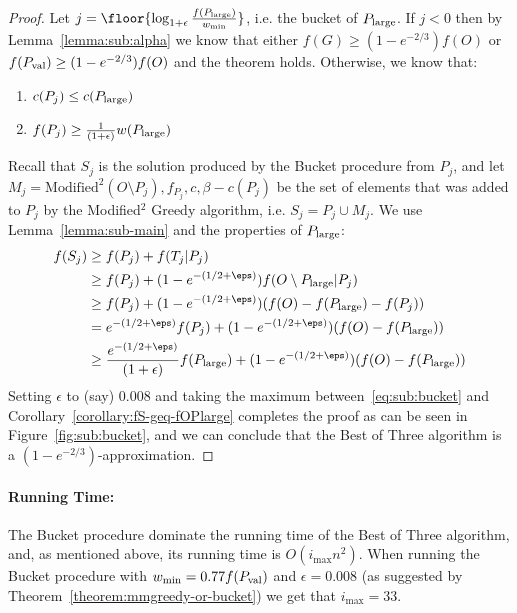 \begin{proof}
	Let $j = \floor{\log_{1 + \epsilon}\frac{f(\pLarge)}{w_{\min}}}$, i.e. the bucket of $P_{\text{large}}$.
	If $j < 0$ then by Lemma~\ref{lemma:sub:alpha} we know that either $f(G) \geq (1 - e^{-2/3})f(O)$ or $f(P_{\text{val}}) \geq (1 - e^{-2/3})f(O)$ and the theorem holds.
	Otherwise, we know that:
	\begin{enumerate}
		\item $c(P_j) \leq c(P_{\text{large}})$
		\item $f(P_j) \geq \frac{1}{(1 + \epsilon)}w(P_{\text{large}})$
	\end{enumerate}
	Recall that $S_{j}$ is the solution produced by the Bucket procedure from $P_j$, and let $M_j = \text{Modified}^2(O \setminus P_j), f_{P_j}, c, \beta - c(P_j)$ be the set of elements that was added to $P_j$ by the Modified$^2$ Greedy algorithm, i.e. $S_j = P_j \cup M_j$.
	We use Lemma~\ref{lemma:sub-main} and the properties of $P_{\text{large}}$:
	\begin{align}
		f(S_{j}) 
		&
		\geq f(P_j) + f(T_j|P_j)
		\\ & 
		\geq f(P_j) + (1-e^{-(1/2 + \eps)})f(O \setminus \pLarge | P_j)
		\\ & 
		\geq f(P_j) + (1-e^{-(1/2 + \eps)})(f(O) - f(\pLarge) - f(P_j))
		\\ & 
		= e^{-(1/2 + \eps)}f(P_j) + (1-e^{-(1/2 + \eps)})(f(O) - f(\pLarge))
		\\ & 
		\geq \frac{e^{-(1/2 + \eps)}}{(1 + \epsilon)}f(\pLarge) + (1-e^{-(1/2 + \eps)})(f(O) - f(\pLarge))
		\label{eq:sub:bucket}
	\end{align}
	Setting $\epsilon$ to (say) $0.008$ and taking the maximum between~\ref{eq:sub:bucket} and Corollary~\ref{corollary:fS-geq-fOPlarge} completes the proof as can be seen in Figure~\ref{fig:sub:bucket}, and we can conclude that the Best of Three algorithm is a $(1 - e^{-2/3})$-approximation.
\end{proof}


\paragraph{Running Time:}
The Bucket procedure dominate the running time of the Best of Three algorithm, and, as mentioned above, its running time is $O(i_{\max}n^2)$.
When running the Bucket procedure with $w_{\min} = 0.77f(P_{\text{val}})$ and $\epsilon = 0.008$ (as suggested by Theorem~\ref{theorem:mmgreedy-or-bucket}) we get that $i_{\max} = 33$.

